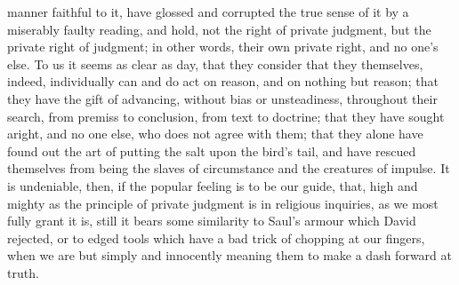 manner faithful to it, have glossed and corrupted the true sense of it
by a miserably faulty reading, and hold, not the right of private
judgment, but the private right of judgment; in other words, their own
private right, and no one's else. To us it seems as clear as day, that
they consider that they themselves, indeed, individually can and do
act on reason, and on nothing but reason; that they have the gift of
advancing, without bias or unsteadiness, throughout their search, from
premiss to conclusion, from text to doctrine; that they have sought
aright, and no one else, who does not agree with them; that they alone
have found out the art of putting the salt upon the bird's tail, and
have rescued themselves from being the slaves of circumstance and the
creatures of impulse. It is undeniable, then, if the popular feeling
is to be our guide, that, high and mighty as the principle of private
judgment is in religious inquiries, as we most fully grant it is,
still it bears some similarity to Saul's armour which David rejected,
or to edged tools which have a bad trick of chopping at our fingers,
when we are but simply and innocently meaning them to make a dash
forward at truth.

